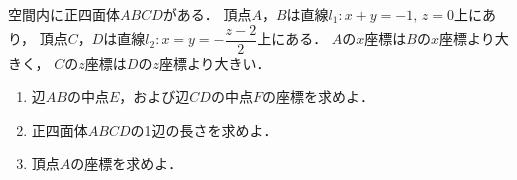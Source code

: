 \documentclass[../../main.tex]{subfiles}
\begin{document}
空間内に正四面体$ABCD$がある．
頂点$A$，$B$は直線$l_1:x+y=-1, \, z=0$上にあり，
頂点$C$，$D$は直線$\displaystyle l_2:x=y=-\dfrac{z-2}{2}$上にある．
$A$の$x$座標は$B$の$x$座標より大きく，
$C$の$z$座標は$D$の$z$座標より大きい．
\begin{enumerate}
  \item 辺$AB$の中点$E$，および辺$CD$の中点$F$の座標を求めよ．
  \item 正四面体$ABCD$の1辺の長さを求めよ．
  \item 頂点$A$の座標を求めよ．
\end{enumerate}
\end{document}
